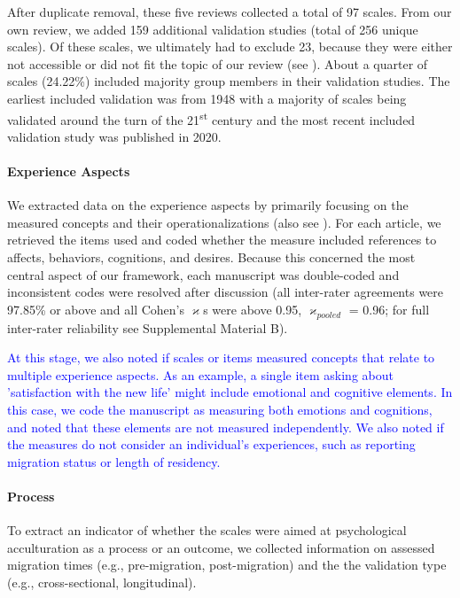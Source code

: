After duplicate removal, these five reviews collected a total of 97
scales. From our own review, we added 159 additional validation studies
(total of 256 unique scales). Of these scales, we ultimately had to
exclude 23, because they were either not accessible or did not fit the
topic of our review (see ). About a
quarter of scales (24.22\%) included majority group members in their
validation studies. The earliest included validation was from 1948 with
a majority of scales being validated around the turn of the
21\textsuperscript{st} century and the most recent included validation
study was published in 2020.

\paragraph{Experience Aspects}

We extracted data on the experience aspects by primarily focusing on the
measured concepts and their operationalizations (also see
). For each article, we retrieved the items
used and coded whether the measure included references to affects,
behaviors, cognitions, and desires. Because this concerned the most
central aspect of our framework, each manuscript was double-coded and
inconsistent codes were resolved after discussion (all inter-rater
agreements were 97.85\% or above and all Cohen's \(\varkappa\)s were
above 0.95, \(\varkappa_{pooled}\) = 0.96; for full inter-rater
reliability see Supplemental Material B).

\textcolor{blue}{At this stage, we also noted if scales or items measured concepts that relate to multiple experience aspects. As an example, a single item asking about 'satisfaction with the new life' might include emotional and cognitive elements. In this case, we code the manuscript as measuring both emotions and cognitions, and noted that these elements are not measured independently. We also noted if the measures do not consider an individual's experiences, such as reporting migration status or length of residency.}

\paragraph{Process}

To extract an indicator of whether the scales were aimed at
psychological acculturation as a process or an outcome, we collected
information on assessed migration times (e.g., pre-migration,
post-migration) and the the validation type (e.g., cross-sectional,
longitudinal).

